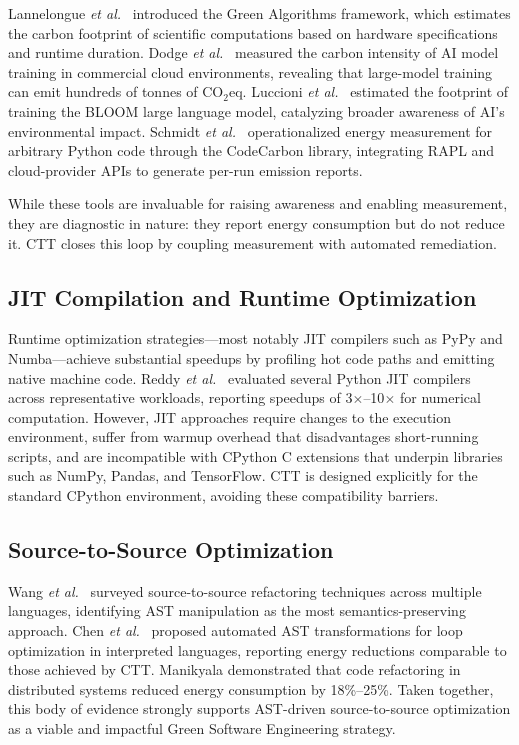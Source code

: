 \documentclass[conference]{IEEEtran}
\begin{document}
Lannelongue \textit{et al.}\ \cite{ref5} introduced the Green Algorithms
framework, which estimates the carbon footprint of scientific computations
based on hardware specifications and runtime duration.  Dodge \textit{et al.}\
\cite{ref11} measured the carbon intensity of AI model training in commercial
cloud environments, revealing that large-model training can emit hundreds of
tonnes of $\mathrm{CO_2eq}$.  Luccioni \textit{et al.}\ \cite{ref2} estimated
the footprint of training the BLOOM large language model, catalyzing broader
awareness of AI's environmental impact.  Schmidt \textit{et al.}\ \cite{ref9}
operationalized energy measurement for arbitrary Python code through the
CodeCarbon library, integrating RAPL and cloud-provider APIs to generate
per-run emission reports.

While these tools are invaluable for raising awareness and enabling
measurement, they are diagnostic in nature: they report energy consumption
but do not reduce it.  CTT closes this loop by coupling measurement with
automated remediation.

\subsection{JIT Compilation and Runtime Optimization}

Runtime optimization strategies---most notably JIT compilers such as PyPy and
Numba---achieve substantial speedups by profiling hot code paths and emitting
native machine code.  Reddy \textit{et al.}\ \cite{ref10} evaluated several
Python JIT compilers across representative workloads, reporting speedups of
3$\times$--10$\times$ for numerical computation.  However, JIT approaches
require changes to the execution environment, suffer from warmup overhead that
disadvantages short-running scripts, and are incompatible with CPython C
extensions that underpin libraries such as NumPy, Pandas, and TensorFlow.
CTT is designed explicitly for the standard CPython environment, avoiding
these compatibility barriers.

\subsection{Source-to-Source Optimization}

Wang \textit{et al.}\ \cite{ref21} surveyed source-to-source refactoring
techniques across multiple languages, identifying AST manipulation as the
most semantics-preserving approach.  Chen \textit{et al.}\ \cite{ref23}
proposed automated AST transformations for loop optimization in interpreted
languages, reporting energy reductions comparable to those achieved by CTT.
Manikyala \cite{ref16} demonstrated that code refactoring in distributed
systems reduced energy consumption by 18\%--25\%.  Taken together, this body
of evidence strongly supports AST-driven source-to-source optimization as a
viable and impactful Green Software Engineering strategy.
\end{document}
